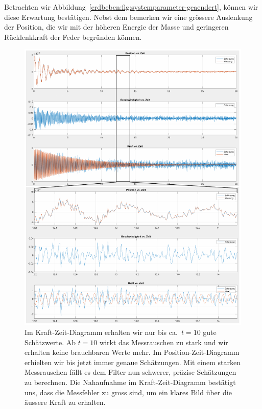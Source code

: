Betrachten wir Abbildung~\ref{erdbeben:fig:systemparameter-geaendert}, können wir diese Erwartung bestätigen.
Nebst dem bemerken wir eine grössere Auslenkung der Position, die wir mit der höheren Energie der Masse und geringeren Rücklenkkraft der Feder begründen können.



\begin{figure}
  \begin{center}
    \includegraphics[width=.95\linewidth,keepaspectratio]{papers/erdbeben/images/Messrauschen_geaendert.PDF}
    \caption{
      Im Kraft-Zeit-Diagramm erhalten wir nur bis ca.\ $t = 10$ gute Schätzwerte.
      Ab $t = 10$ wirkt das Messrauschen zu stark und wir erhalten keine brauchbaren Werte mehr.
      Im Position-Zeit-Diagramm erhielten wir bis jetzt immer genaue Schätzungen.
      Mit einem starken Messrauschen fällt es dem Filter nun schwerer,
      präzise Schätzungen zu berechnen.
      Die Nahaufnahme im Kraft-Zeit-Diagramm bestätigt uns,
      dass die Messfehler zu gross sind,
      um ein klares Bild über die äussere Kraft zu erhalten.
    }
   \label{erdbeben:fig:messrauschen-geaendert}
  \end{center}
\end{figure}

